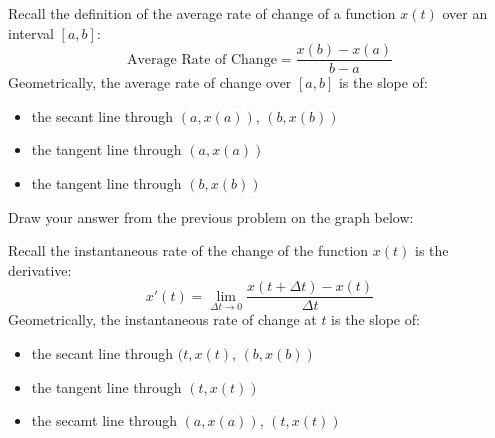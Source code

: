 \documentclass[pdftex, brazil, 12pt, twoside]{article}
\newcommand{\bolota}{\item[$\bigcirc$]}
\begin{document}
\begin{Exercise}[title={Review of the average rate of change}]
  \noindent Recall the definition of the average rate of change of a function $x(t)$ over an
  interval $[a, b]$:
  \begin{equation}
    \text{Average Rate of Change} = \frac{x(b) - x(a)}{b - a}
  \end{equation}
  \noindent Geometrically, the average rate of change over $[a, b]$ is the slope of:
  \begin{itemize}[noitemsep]
  \bolota the secant line through $(a, x(a))$, $(b, x(b))$
  \bolota the tangent line through $(a, x(a))$
  \bolota the tangent line through $(b, x(b))$
  \end{itemize}
\end{Exercise}

\begin{Exercise}[title={Draw your answer, average rate of change}]
  \noindent Draw your answer from the previous problem on the graph below:
  \begin{figure}[H]
    \begin{center}
      \label{fig:mvt-avgxinst-2}
    \end{center}
  \end{figure}
\end{Exercise}

\begin{Exercise}[title={Review of instantaneous rate of change}]
  \noindent Recall the instantaneous rate of the change of the function $x(t)$
  is the derivative: 
  \begin{equation}
    x'(t) = \lim_{\Delta t \to 0} \frac{x(t + \Delta t) - x(t)}{\Delta t}
  \end{equation}
  \noindent Geometrically, the instantaneous rate of change at $t$ is the slope of:
  \begin{itemize}[noitemsep]
  \bolota the secant line through $(t, x(t)$, $(b, x(b))$
  \bolota the tangent line through $(t, x(t))$
  \bolota the secamt line through $(a, x(a))$, $(t, x(t))$
  \end{itemize}
\end{Exercise}
\end{document}
